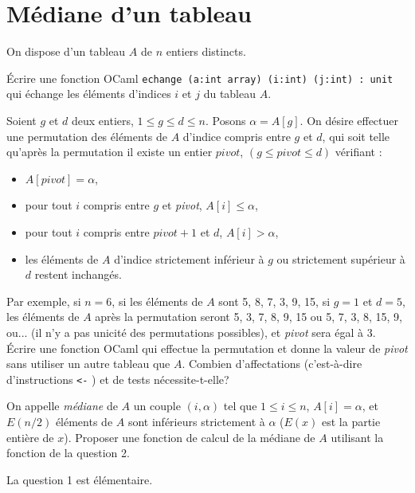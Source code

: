\renewcommand{\SourceFile}{1-parcours-de-tableaux/src/1-2.ml}

\vspace{16pt}
\section{Médiane d'un tableau}

On dispose d'un tableau $A$ de $n$ entiers distincts.

\Q
Écrire une fonction OCaml \texttt{echange (a:int array) (i:int) (j:int) : unit} qui échange les éléments d'indices $i$ et $j$ du tableau $A$.

\Q
Soient $g$ et $d$ deux entiers, $1\leq g\leq d \leq n$. Posons $\alpha=A[g]$. On désire effectuer une permutation des éléments de $A$ d'indice compris entre $g$ et $d$, qui soit telle qu'après la permutation il existe un entier $pivot$, $(g\leq pivot \leq d)$ vérifiant :

\begin{itemize}
    \item $A[\textit{pivot}]=\alpha$,
    \item pour tout $i$ compris entre $g$ et \textit{pivot}, $A[i]\leq\alpha$,
    \item pour tout $i$ compris entre $\textit{pivot}+1$ et $d$, $A[i]>\alpha$,
    \item les éléments de $A$ d'indice strictement inférieur à $g$ ou strictement supérieur à $d$ restent inchangés.
\end{itemize}

Par exemple, si $n=6$, si les éléments de $A$ sont 5, 8, 7, 3, 9, 15, si $g=1$ et $d=5$, les éléments de $A$ après la permutation seront 5, 3, 7, 8, 9, 15 ou 5, 7, 3, 8, 15, 9, ou... (il n'y a pas unicité des permutations possibles), et \textit{pivot} sera égal à 3. Écrire une fonction OCaml qui effectue la permutation et donne la valeur de \textit{pivot} sans utiliser un autre tableau que $A$. Combien d'affectations (c'est-à-dire d'instructions \og \texttt{<-} \fg) et de tests nécessite-t-elle?

\Q
On appelle \textit{médiane} de $A$ un couple $(i,\alpha)$ tel que $1\leq i\leq n$, $A[i]=\alpha$, et $E(n/2)$ éléments de $A$ sont inférieurs strictement à $\alpha$ ($E(x)$ est la partie entière de $x$). Proposer une fonction de calcul de la médiane de $A$ utilisant la fonction de la question 2.

\Corrige

\Q
La question 1 est élémentaire.

